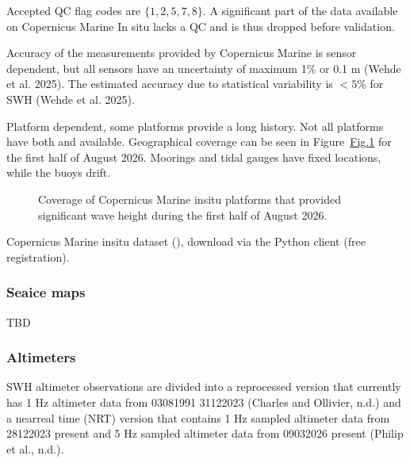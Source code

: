 \documentclass[a4paper,10pt,english]{sphinxmanual}
\begin{document}
\sphinxAtStartPar
Accepted QC flag codes are \(\{1,2,5,7,8\}\). A significant part of the data available on Copernicus Marine In situ lacks a QC and is thus dropped before validation.

\sphinxAtStartPar
Accuracy of the measurements provided by Copernicus Marine is sensor dependent, but all sensors have an uncertainty of maximum 1\% or 0.1 m (Wehde et al. 2025). The estimated accuracy due to statistical variability is \(< 5\)\% for SWH (Wehde et al. 2025).

\sphinxAtStartPar
{}

\sphinxAtStartPar
Platform dependent, some platforms provide a long history. Not all platforms have both  and  available. Geographical coverage can be seen in Figure \hyperref[\detokenize{05_reference_datasets:fig-in-situ-waves-coverage}]{Fig.\@ \ref{\detokenize{05_reference_datasets:fig-in-situ-waves-coverage}}} for the first half of August 2026. Moorings and tidal gauges have fixed locations, while the buoys drift.

\begin{figure}[htbp]
\centering
\capstart

\noindent{}
\caption{Coverage of Copernicus Marine in\sphinxhyphen{}situ platforms that provided significant wave height during the first half of August 2026.}\label{\detokenize{05_reference_datasets:fig-in-situ-waves-coverage}}\end{figure}

\sphinxAtStartPar
{}

\sphinxAtStartPar
Copernicus Marine in\sphinxhyphen{}situ dataset (), download via the  Python client (free registration).


\subsubsection{Sea\sphinxhyphen{}ice maps}
\label{\detokenize{05_reference_datasets:sea-ice-maps}}
\sphinxAtStartPar
TBD


\subsubsection{Altimeters}
\label{\detokenize{05_reference_datasets:altimeters}}
\sphinxAtStartPar
SWH altimeter observations are divided into a reprocessed version that currently has 1 Hz altimeter data from 03\sphinxhyphen{}08\sphinxhyphen{}1991 \sphinxhyphen{} 31\sphinxhyphen{}12\sphinxhyphen{}2023 (Charles and Ollivier, n.d.) and a near\sphinxhyphen{}real time (NRT) version that contains 1 Hz sampled altimeter data from 28\sphinxhyphen{}12\sphinxhyphen{}2023 \sphinxhyphen{} present and 5 Hz sampled altimeter data from 09\sphinxhyphen{}03\sphinxhyphen{}2026 \sphinxhyphen{} present (Philip et al., n.d.).
\end{document}

